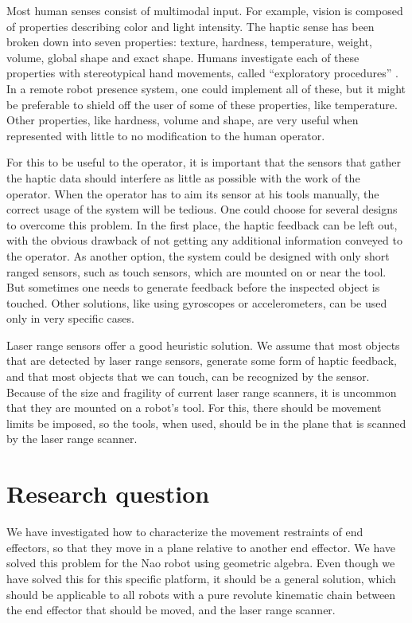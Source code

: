 
Most human senses consist of multimodal input. For example, vision is composed
of properties describing color and light intensity.  The haptic sense has been
broken down into seven properties: texture, hardness, temperature, weight,
volume, global shape and exact shape.  Humans investigate each of these
properties with stereotypical hand movements, called ``exploratory
procedures'' \cite{Lederman1993}.  In a remote robot presence system, one
could implement all of these, but it might be preferable to shield off the
user of some of these properties, like temperature.  Other properties, like
hardness, volume and shape, are very useful when represented with little to no
modification to the human operator.  

For this to be useful to the operator, it is important that the sensors that
gather the haptic data should interfere as little as possible with the work of
the operator.  When the operator has to aim its sensor at his tools manually,
the correct usage of the system will be tedious.  One could choose for several
designs to overcome this problem.  In the first place, the haptic feedback can
be left out, with the obvious drawback of not getting any additional
information conveyed to the operator.  As another option, the system could be
designed with only short ranged sensors, such as touch sensors, which are
mounted on or near the tool.  But sometimes one needs to generate feedback
before the inspected object is touched.  Other solutions, like using
gyroscopes or accelerometers, can be used only in very specific cases.  

Laser range sensors offer a good heuristic solution.  We assume that most
objects that are detected by laser range sensors, generate some form of haptic
feedback, and that most objects that we can touch, can be recognized by the
sensor.  Because of the size and fragility of current laser range scanners,
it is uncommon that they are mounted on a robot's tool.  For this, there
should be movement limits be imposed, so the tools, when used, should be in
the plane that is scanned by the laser range scanner.


\section{Research question}
We have investigated how to characterize the movement restraints of end
effectors, so that they move in a plane relative to another end effector.  We
have solved this problem for the Nao robot\cite{NaoSpec} using geometric
algebra.  Even though we have solved this for this specific platform, it
should be a general solution, which should be applicable to all robots with a
pure revolute kinematic chain between the end effector that should be moved,
and the laser range scanner.


